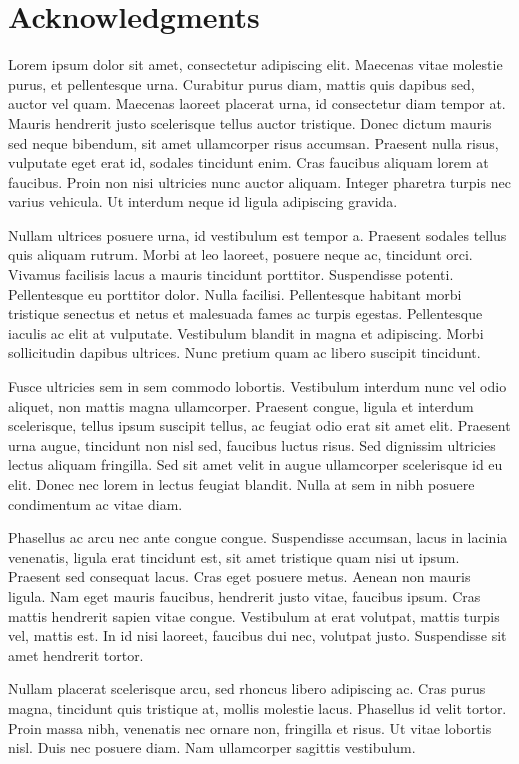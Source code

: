 \chapter*{Acknowledgments}
\thispagestyle{empty}
\normalsize

\pagestyle{default}



Lorem ipsum dolor sit amet, consectetur adipiscing elit. Maecenas vitae molestie purus, et pellentesque urna. Curabitur purus diam, mattis quis dapibus sed, auctor vel quam. Maecenas laoreet placerat urna, id consectetur diam tempor at. Mauris hendrerit justo scelerisque tellus auctor tristique. Donec dictum mauris sed neque bibendum, sit amet ullamcorper risus accumsan. Praesent nulla risus, vulputate eget erat id, sodales tincidunt enim. Cras faucibus aliquam lorem at faucibus. Proin non nisi ultricies nunc auctor aliquam. Integer pharetra turpis nec varius vehicula. Ut interdum neque id ligula adipiscing gravida.

Nullam ultrices posuere urna, id vestibulum est tempor a. Praesent sodales tellus quis aliquam rutrum. Morbi at leo laoreet, posuere neque ac, tincidunt orci. Vivamus facilisis lacus a mauris tincidunt porttitor. Suspendisse potenti. Pellentesque eu porttitor dolor. Nulla facilisi. Pellentesque habitant morbi tristique senectus et netus et malesuada fames ac turpis egestas. Pellentesque iaculis ac elit at vulputate. Vestibulum blandit in magna et adipiscing. Morbi sollicitudin dapibus ultrices. Nunc pretium quam ac libero suscipit tincidunt.

Fusce ultricies sem in sem commodo lobortis. Vestibulum interdum nunc vel odio aliquet, non mattis magna ullamcorper. Praesent congue, ligula et interdum scelerisque, tellus ipsum suscipit tellus, ac feugiat odio erat sit amet elit. Praesent urna augue, tincidunt non nisl sed, faucibus luctus risus. Sed dignissim ultricies lectus aliquam fringilla. Sed sit amet velit in augue ullamcorper scelerisque id eu elit. Donec nec lorem in lectus feugiat blandit. Nulla at sem in nibh posuere condimentum ac vitae diam.

Phasellus ac arcu nec ante congue congue. Suspendisse accumsan, lacus in lacinia venenatis, ligula erat tincidunt est, sit amet tristique quam nisi ut ipsum. Praesent sed consequat lacus. Cras eget posuere metus. Aenean non mauris ligula. Nam eget mauris faucibus, hendrerit justo vitae, faucibus ipsum. Cras mattis hendrerit sapien vitae congue. Vestibulum at erat volutpat, mattis turpis vel, mattis est. In id nisi laoreet, faucibus dui nec, volutpat justo. Suspendisse sit amet hendrerit tortor.

Nullam placerat scelerisque arcu, sed rhoncus libero adipiscing ac. Cras purus magna, tincidunt quis tristique at, mollis molestie lacus. Phasellus id velit tortor. Proin massa nibh, venenatis nec ornare non, fringilla et risus. Ut vitae lobortis nisl. Duis nec posuere diam. Nam ullamcorper sagittis vestibulum. 